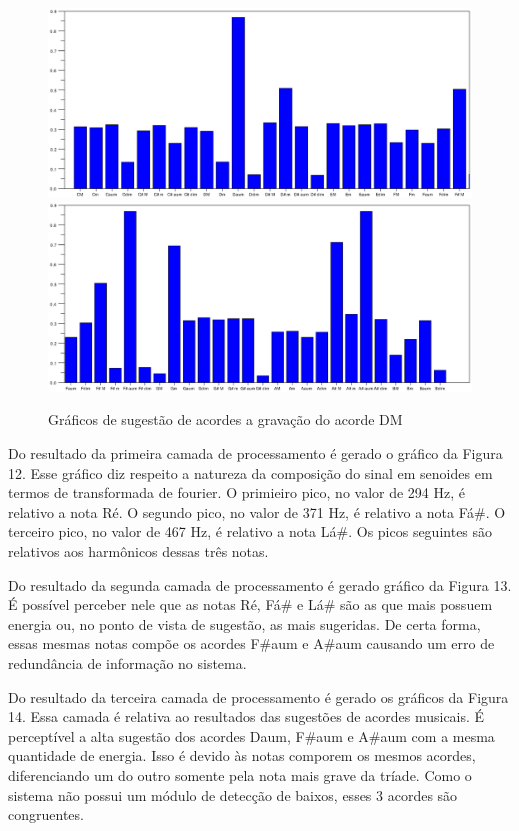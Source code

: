\begin{figure}[h]
	\centering
		\includegraphics[keepaspectratio=true,scale=0.49]{figuras/Dm/acordes_1_Daum.eps}
		\includegraphics[keepaspectratio=true,scale=0.49]{figuras/Dm/acordes_2_Daum.eps}
	\caption{Gráficos de sugestão de acordes a gravação do acorde DM}
\end{figure}
\newpage

Do resultado da primeira camada de processamento é gerado o gráfico da Figura 12. Esse gráfico diz respeito a natureza da composição do sinal em senoides em termos de transformada de fourier. O primieiro pico, no valor de 294 Hz, é relativo a nota Ré. O segundo pico, no valor de 371 Hz, é relativo a nota Fá\#. O terceiro pico, no valor de 467 Hz, é relativo a nota Lá\#. Os picos seguintes são relativos aos harmônicos dessas três notas. 

Do resultado da segunda camada de processamento é gerado gráfico da Figura 13. É possível perceber nele que as notas Ré, Fá\# e Lá\# são as que mais possuem energia ou, no ponto de vista de sugestão, as mais sugeridas. De certa forma, essas mesmas notas compõe os acordes F\#aum e A\#aum causando um erro de redundância de informação no sistema.  

Do resultado da terceira camada de processamento é gerado os gráficos da Figura 14. Essa camada é relativa ao resultados das sugestões de acordes musicais. É perceptível a alta sugestão dos acordes Daum, F\#aum e A\#aum com a mesma quantidade de energia. Isso é devido às notas comporem os mesmos acordes, diferenciando um do outro somente pela nota mais grave da tríade. Como o sistema não possui um módulo de detecção de baixos, esses 3 acordes são congruentes.



